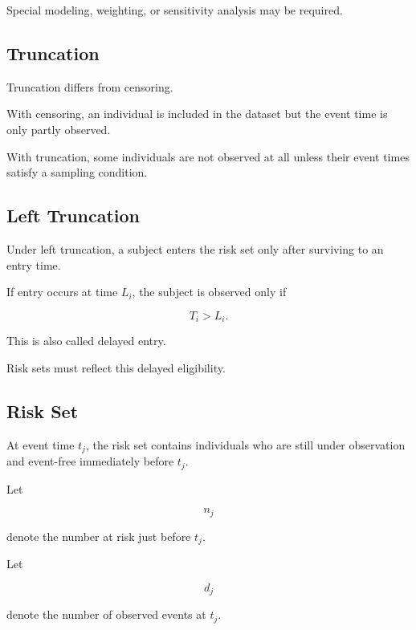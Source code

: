 Special modeling, weighting, or sensitivity analysis may be required.

\subsection{Truncation}
\label{subsec:survival-truncation}

Truncation differs from censoring.

With censoring, an individual is included in the dataset but the event
time is only partly observed.

With truncation, some individuals are not observed at all unless their
event times satisfy a sampling condition.

\subsection{Left Truncation}
\label{subsec:left-truncation}

Under left truncation, a subject enters the risk set only after surviving
to an entry time.

If entry occurs at time \(L_i\), the subject is observed only if

\[
\boxed{
T_i>L_i.
}
\]

This is also called delayed entry.

Risk sets must reflect this delayed eligibility.

\subsection{Risk Set}
\label{subsec:risk-set}

At event time \(t_j\), the risk set contains individuals who are still
under observation and event-free immediately before \(t_j\).

Let

\[
\boxed{
n_j
}
\]

denote the number at risk just before \(t_j\).

Let

\[
\boxed{
d_j
}
\]

denote the number of observed events at \(t_j\).

